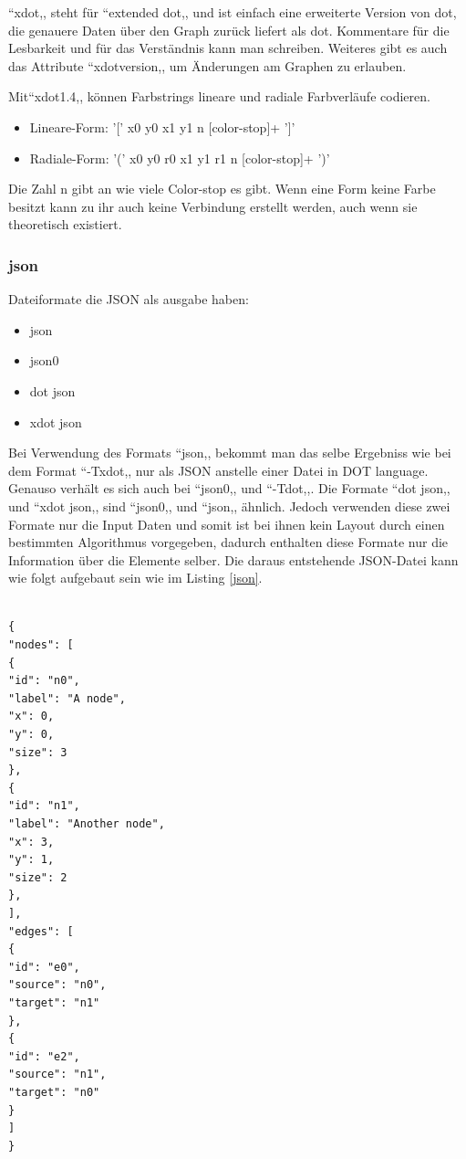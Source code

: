\noindent
``xdot,, steht für ``extended dot,, und ist einfach eine erweiterte Version von dot, die genauere Daten über den Graph zurück liefert als dot.
Kommentare für die Lesbarkeit und für das Verständnis kann man schreiben. Weiteres gibt es auch das Attribute ``xdotversion,, um Änderungen am Graphen zu erlauben. 

\noindent
Mit``xdot1.4,, können Farbstrings lineare und radiale Farbverläufe codieren.
\begin{itemize}
	\item Lineare-Form:  '[' x0 y0 x1 y1 n [color-stop]+ ']'
	\item Radiale-Form:  '(' x0 y0 r0 x1 y1 r1 n [color-stop]+ ')' 
\end{itemize}
\noindent
Die Zahl n gibt an wie viele Color-stop es gibt. 
Wenn eine Form keine Farbe besitzt kann zu ihr auch keine Verbindung erstellt werden, auch wenn sie theoretisch existiert.


\newpage
\fib{}
\subsubsection{json}
\noindent
Dateiformate die JSON als ausgabe haben:
\begin{itemize}
	\item json
	\item json0
	\item dot json
	\item xdot json
\end{itemize}
\noindent
Bei Verwendung des Formats ``json,, bekommt man das selbe Ergebniss wie bei dem Format ``-Txdot,, nur als JSON anstelle einer Datei in DOT language. Genauso verhält es sich auch bei ``json0,, und ``-Tdot,,. Die Formate ``dot json,, und ``xdot json,, sind ``json0,, und ``json,, ähnlich. Jedoch verwenden diese zwei Formate nur die Input Daten und somit ist bei ihnen kein Layout durch einen bestimmten Algorithmus vorgegeben, dadurch enthalten diese Formate nur die Information über die Elemente selber.
Die daraus entstehende JSON-Datei kann wie folgt aufgebaut sein wie im Listing \ref{json}.

\noindent
\lstset{language=python}
\lstset{frame=lines}
\lstset{basicstyle=\footnotesize}
\begin{lstlisting}

{
"nodes": [
{
"id": "n0",
"label": "A node",
"x": 0,
"y": 0,
"size": 3
},
{
"id": "n1",
"label": "Another node",
"x": 3,
"y": 1,
"size": 2
},
],
"edges": [
{
"id": "e0",
"source": "n0",
"target": "n1"
},
{
"id": "e2",
"source": "n1",
"target": "n0"
}
]
}

\end{lstlisting}

